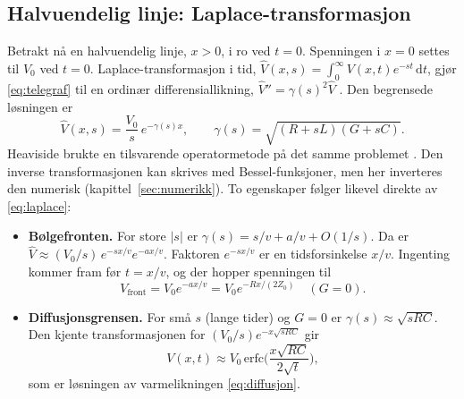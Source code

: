 \documentclass[11pt,a4paper]{article}
\numberwithin{equation}{section}
\numberwithin{figure}{section}
\numberwithin{table}{section}
\newcommand{\dd}{\mathrm{d}}
\begin{document}
\subsection{Halvuendelig linje: Laplace-transformasjon}\label{sec:laplace}
Betrakt nå en halvuendelig linje, $x > 0$, i ro ved $t = 0$. Spenningen i
$x = 0$ settes til $V_0$ ved $t = 0$. Laplace-transformasjon i tid,
$\hat V(x,s) = \int_0^\infty V(x,t)e^{-st}\,\dd t$, gjør \eqref{eq:telegraf} til en
ordinær differensiallikning, $\hat V'' = \gamma(s)^2\hat V$ \cite{kreyszig2011}.
Den begrensede løsningen er
\begin{equation}
  \hat V(x,s) = \frac{V_0}{s}\,e^{-\gamma(s)x}, \qquad
  \gamma(s) = \sqrt{(R + sL)(G + sC)}. \label{eq:laplace}
\end{equation}
Heaviside brukte en tilsvarende operatormetode på det samme problemet
\cite{heaviside1893,nahin2002}. Den inverse transformasjonen kan skrives med
Bessel-funksjoner, men her inverteres den numerisk (kapittel~\ref{sec:numerikk}).
To egenskaper følger likevel direkte av \eqref{eq:laplace}:
\begin{itemize}
  \item \textbf{Bølgefronten.} For store $|s|$ er
        $\gamma(s) = s/v + a/v + O(1/s)$. Da er
        $\hat V \approx (V_0/s)\,e^{-sx/v}e^{-ax/v}$. Faktoren $e^{-sx/v}$ er en
        tidsforsinkelse $x/v$. Ingenting kommer fram før $t = x/v$, og der hopper
        spenningen til
        \begin{equation}
          V_{\text{front}} = V_0e^{-ax/v} = V_0e^{-Rx/(2Z_0)} \quad (G = 0). \label{eq:front}
        \end{equation}
  \item \textbf{Diffusjonsgrensen.} For små $s$ (lange tider) og $G = 0$ er
        $\gamma(s) \approx \sqrt{sRC}$. Den kjente transformasjonen for
        $(V_0/s)e^{-x\sqrt{sRC}}$ gir
        \begin{equation}
          V(x,t) \approx V_0\,\mathrm{erfc}\Big(\frac{x\sqrt{RC}}{2\sqrt t}\Big), \label{eq:erfc}
        \end{equation}
        som er løsningen av varmelikningen \eqref{eq:diffusjon}.
\end{itemize}
\end{document}
